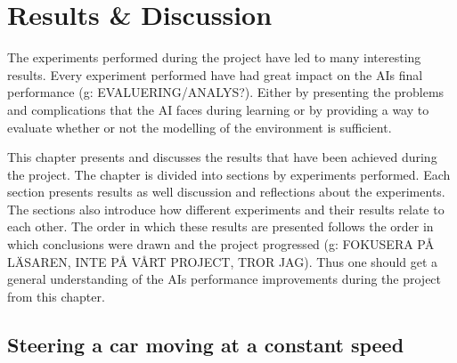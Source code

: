 

\chapter{Results \& Discussion}
The experiments performed during the project have led to many interesting results. Every experiment performed have had great impact on the AIs final performance (g: EVALUERING/ANALYS?). Either by presenting the problems and complications that the AI faces during learning or by providing a way to evaluate whether or not the modelling of the environment is sufficient.

This chapter presents and discusses the results that have been achieved during the project. The chapter is divided into sections by experiments performed. Each section presents results as well discussion and reflections about the experiments. The sections also introduce how different experiments and their results relate to each other. The order in which these results are presented follows the order in which conclusions were drawn and the project progressed (g: FOKUSERA PÅ LÄSAREN, INTE PÅ VÅRT PROJECT, TROR JAG). Thus one should get a general understanding of the AIs performance improvements during the project from this chapter.


\section{Steering a car moving at a constant speed}


